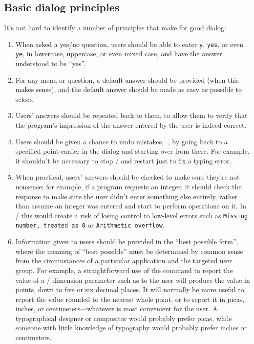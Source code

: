 \subsection{Basic dialog principles}
It's not hard to identify a number of principles that make for good
dialog:
\begin{enumerate}
\item When asked a yes/no question, users should
be able to enter \verb|y|, \verb|yes|, or even \verb|ye|,
in lowercase, uppercase, or even mixed case, and have the
answer understood to be ``yes''.

\item For any menu or question, a default answer
should be provided (when this makes sense), and the default
answer should be made as easy as possible to select.

\item Users' answers should be repeated back to them,
to allow them to verify that the program's impression
of the answer entered by the user is indeed correct.

\item Users should be given a chance to undo mistakes,
\eg., by going back to a specified point earlier in the
dialog and starting over from there. For example, it shouldn't be necessary to
stop \tex/ and restart just to fix a typing error.

\item When practical, users' answers should be checked to make sure
they're not nonsense; for example, if a program requests an integer,
it should check the response to make sure the user didn't enter
something else entirely, rather than assume an integer was entered and
start to perform operations on it. In \tex/ this would create a risk
of losing control to low-level errors such as
{\tt Missing number, treated as~0} or {\tt Arithmetic overflow}.

\item Information given to users should be provided in the ``best
possible form'', where the meaning of ``best possible'' must be
determined by common sense from the circumstances of a particular
application and the targeted user group. For example, a
straightforward use of the  command to report the value of a
\tex/ dimension parameter such as  to the user will produce
the value in points, down to five or six decimal places. It will
normally be more useful to report the value rounded to the nearest
whole point, or to report it in picas, inches, or
centimeters---whatever is most convenient for the user. A
typographical designer or compositor would probably prefer picas,
while someone with little knowledge of typography would probably
prefer inches or centimeters.

\end{enumerate}

